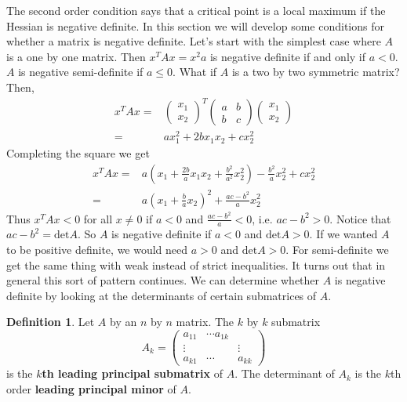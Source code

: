 \documentclass[12pt,reqno]{amsart}
\theoremstyle{definition}
\newtheorem{definition}{Definition}[section]
\renewcommand{\det}{\mathrm{det}}
\begin{document}
The second order condition says that a critical point is a local
maximum if the Hessian is negative definite. In this section we will
develop some conditions for whether a matrix is negative
definite. Let's start with the simplest case where $A$ is a one by one
matrix. Then $x^T A x = x^2 a$ is negative definite if and only if $a
< 0$. $A$ is negative semi-definite if $a\leq 0$. What if $A$ is a two
by two symmetric matrix? Then,
\begin{align*}
  x^T A x = & \begin{pmatrix} x_1 \\ x_2 \end{pmatrix}^T 
  \begin{pmatrix}
    a & b \\ b & c 
  \end{pmatrix}
  \begin{pmatrix} x_1 \\ x_2 \end{pmatrix}
  \\ 
  = & a x_1^2 + 2b x_1 x_2 + c x_2^2
\end{align*}
Completing the square we get
\begin{align*}
  x^T A x = & a\left(x_1 + \frac{2b}{a} x_1 x_2 + \frac{b^2}{a^2}
    x_2^2\right) - \frac{b^2}{a} x_2^2 + c x_2^2 \\
  = &a\left(x_1 + \frac{b}{a} x_2\right)^2 + \frac{ac-b^2}{a} x_2^2 
\end{align*}
Thus $x^T A x < 0$ for all $x \neq 0$ if $a < 0$ and
$\frac{ac-b^2}{a}<0$, i.e. $ac - b^2 > 0$. Notice that $ac - b^2 =
\det A$. So $A$ is negative definite if $a<0$ and $\det A > 0$. If we
wanted $A$ to be positive definite, we would need $a>0$ and $\det A >
0$. For semi-definite we get the same thing with weak instead of
strict inequalities. It turns out that in general this sort of pattern
continues. We can determine whether $A$ is negative definite by
looking at the determinants of certain submatrices of $A$.
\begin{definition}
  Let $A$ by an $n$ by $n$ matrix. The $k$ by $k$ submatrix 
  \[ A_k = \begin{pmatrix} a_{11} & \cdots a_{1k} \\
    \vdots & & \vdots \\
    a_{k1} & \cdots & a_{kk} \end{pmatrix} \]
  is the \textbf{$k$th leading principal submatrix} of $A$. The
  determinant of $A_k$ is the $k$th order \textbf{leading principal
    minor} of $A$.
\end{definition}
\end{document}
